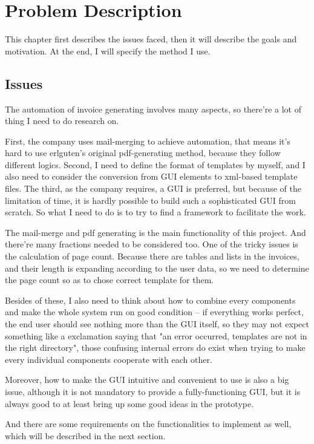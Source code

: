 \documentclass{report}
\begin{document}
\chapter{Problem Description}
  This chapter first describes the issues faced, then it will describe the goals and motivation. At the end, I will specify the method I use.

\section{Issues}
  The automation of invoice generating involves many aspects, so there're a lot of thing I need to do research on. 

  First, the company uses mail-merging to achieve automation, that means it's hard to use erlguten's original pdf-generating method, because they follow different logics. Second, I need to define the format of templates by myself, and I also need to consider the conversion from GUI elements to xml-based template files. The third, as the company requires, a GUI is preferred, but because of the limitation of time, it is hardly possible to build such a sophisticated GUI from scratch. So what I need to do is to try to find a framework to facilitate the work. 

  The mail-merge and pdf generating is the main functionality of this project. And there're many fractions needed to be considered too. One of the tricky issues is the calculation of page count. Because there are tables and lists in the invoices, and their length is expanding according to the user data, so we need to determine the page count so as to chose correct template for them. 

  Besides of these, I also need to think about how to combine every components and make the whole system run on good condition -- if everything works perfect, the end user should see nothing more than the GUI itself, so they may not expect something like a exclamation saying that "an error occurred, templates are not in the right directory", those confusing internal errors do exist when trying to make every individual components cooperate with each other.

  Moreover, how to make the GUI intuitive and convenient to use is also a big issue, although it is not mandatory to provide a fully-functioning GUI, but it is always good to at least bring up some good ideas in the prototype. 

  And there are some requirements on the functionalities to implement as well, which will be described in the next section.
\end{document}
